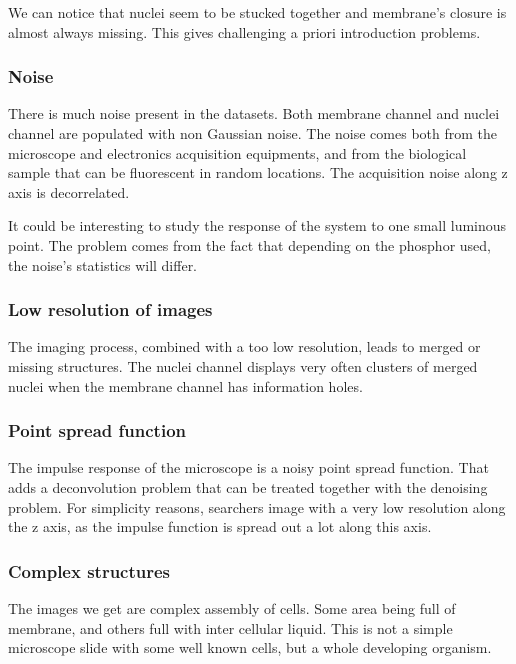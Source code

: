 We can notice that nuclei seem to be stucked together and membrane's closure is almost always missing. This gives challenging a priori introduction problems.


\subsubsection{Noise}

There is much noise present in the datasets. Both membrane channel and nuclei channel are populated with non Gaussian noise.
The noise comes both from the microscope and electronics acquisition equipments, and from the biological sample that can be fluorescent in random locations.
The acquisition noise along z axis is decorrelated.

It could be interesting to study the response of the system to one small luminous point. The problem comes from the fact that depending on the phosphor used, the noise's statistics will differ.

\subsubsection{Low resolution of images}

The imaging process, combined with a too low resolution, leads to merged or missing structures. The nuclei channel displays very often clusters of merged nuclei when the membrane channel has information holes.

\subsubsection{Point spread function}

The impulse response of the microscope is a noisy point spread function. That adds a deconvolution problem that can be treated together with the denoising problem. For simplicity reasons, searchers image with a very low resolution along the z axis, as the impulse function is spread out a lot along this axis.

\subsubsection{Complex structures}

The images we get are complex assembly of cells.
Some area being full of membrane, and others full with inter cellular liquid.
This is not a simple microscope slide with some well known cells, but a whole developing organism.


